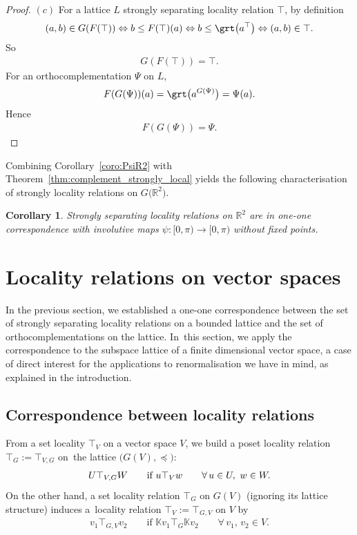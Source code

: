 \documentclass[10pt,a4paper]{amsart}
\numberwithin{equation}{section}
\newtheorem{Corollary}[Theorem]{Corollary}
\newcommand{\R}{\mathbb{R}}
\newcommand{\K}{\mathbb{K}}
\newcommand{\loc}{locality\xspace}
\newcommand{\pone}{separating\xspace }
\begin{document}
\begin{proof}
$(c)$ For a lattice $L$ strongly \pone \loc relation $\top $, by definition
\begin{gather*}
(a,b)\in G(F(\top))\Leftrightarrow b\le F(\top)(a)\Leftrightarrow b \le \grt \big(a^\top\big)\Leftrightarrow (a,b)\in \top.
 \end{gather*}
So
\begin{gather*}
G(F(\top))=\top.
\end{gather*}
For an orthocomplementation $\Psi $ on $L$,
\begin{gather*}
F(G(\Psi ))(a)=\grt \big(a^{G(\Psi)}\big)=\Psi (a).
\end{gather*}
Hence
\begin{gather*}
F(G(\Psi))=\Psi.\tag*{\qed}
\end{gather*}
\renewcommand{\qed}{}
\end{proof}


Combining Corollary~\ref{coro:PsiR2} with Theorem~\ref{thm:complement_strongly_local} yields the following characterisation of strongly locality relations on $G\big(\R^2\big)$.
	\begin{Corollary}\label{cor:topGR2} Strongly separating locality relations on $\R^2$ are in one-one correspondence with involutive maps $\psi\colon [0, \pi)\to [0, \pi)$ without fixed points.
		\end{Corollary}
	
\section{Locality relations on vector spaces}\label{sect:locvectspaces}
In the previous section, we established a one-one correspondence between the set of
strongly \pone \loc relations on a bounded lattice and the set of orthocomplementations on the lattice. In~this section, we apply the correspondence to the subspace lattice of a finite dimensional vector space, a case of direct interest for the applications to renormalisation we have in mind, as explained in the introduction.

\subsection{Correspondence between locality relations}

From a set locality $\top _V$ on a vector space $V$, we build a poset locality relation $\top _G:=\top_{V,G}$ on~the lattice $\big(G(V), \preceq\big)$:
\begin{gather}
\label{eq:locVtoGV}
U\top _{V,G} W\qquad \text{\rm if } u\top _V w \qquad \forall\, u\in U,\ w\in W.
\end{gather}
	On the other hand,
	a set locality relation $\top_G$ on $G(V)$ (ignoring its lattice structure) induces a~locality relation $\top _V:=\top _{G,V}$ on $V$ by
\begin{gather} \label{eq:locGVtoV}
v_1\top_{G,V} v_2\qquad \text{if } \K v_1 \top _G \K v_2 \qquad\forall\, v_1,\, v_2\in V.
\end{gather} 	
\end{document}
